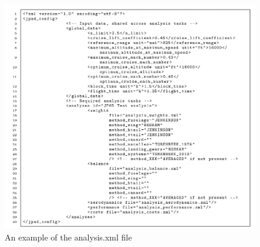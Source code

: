 \begin{figure}[htbp] 
\centering
\includegraphics[height=0.45\textheight]{Immagini/Capitolo1/1_2-AnExampleOfTheAnalysisXmlFile}
\caption[Example of analysis.xml file] {An example of the analysis.xml file}
\label{AnExampleOfTheAnalysisXmlFile}
\end{figure}

